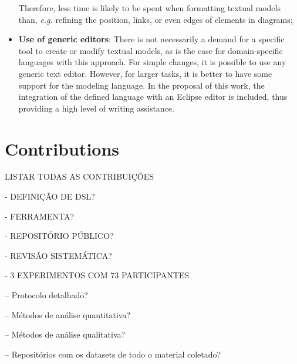 \begin{itemize}
    Therefore, less time is likely to be spent when formatting textual models than, \textit{e.g.} refining the position, links, or even edges of elements in diagrams;
    \item \textbf{Use of generic editors}: 
    There is not necessarily a demand for a specific tool to create or modify textual models, as is the case for domain-specific languages with this approach.
    For simple changes, it is possible to use any generic text editor.
    However, for larger tasks, it is better to have some support for the modeling language.
    In the proposal of this work, the integration of the defined language with an Eclipse editor is included, thus providing a high level of writing assistance.
\end{itemize}

\section{Contributions}

LISTAR TODAS AS CONTRIBUIÇÕES

- DEFINIÇÃO DE DSL?

- FERRAMENTA?

- REPOSITÓRIO PÚBLICO?

- REVISÃO SISTEMÁTICA?

- 3 EXPERIMENTOS COM 73 PARTICIPANTES

    -- Protocolo detalhado?

    -- Métodos de análise quantitativa?

    -- Métodos de análise qualitativa?

    -- Repositórios com os datasets de todo o material coletado?


